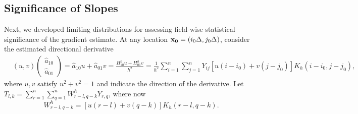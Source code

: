 \documentclass{article}
\def\ha{\hat{a}}
\begin{document}
\subsection{Significance of Slopes}
\label{sec-extreSSS_1st}
Next, we developed limiting distributions for assessing field-wise statistical significance of the gradient estimate.
At any location ${\bf x_0}=(i_0\Delta,j_0\Delta)$, consider the estimated directional derivative
\begin{equation}
	\label{direct_1st}
	\begin{aligned}
		&(u,v)\left(
		\begin{matrix}
			\ha_{10}\\
			\ha_{01}
		\end{matrix}
		\right)=\ha_{10}u+\ha_{01}v=\frac{H^h_{10}u+H^h_{01}v}{h^2}
		=\frac{1}{h^2}\sum_{i=1}^n\sum_{j=1}^nY_{ij}[u(i-i_0)+v(j-j_0)]K_h(i-i_0,j-j_0),
	\end{aligned}
\end{equation}
where $u, v$ satisfy $u^2+v^2=1$ and indicate the direction of the derivative. 
Let $T_{l,k}=\sum_{r=1}^{n}\sum_{q=1}^{n}W^h_{r-l,q-k}Y_{r,q}$,
where now
\begin{equation}
	\label{W_1st}
	W^h_{r-l,q-k}=[u(r-l)+v(q-k)]K_{h}(r-l,q-k).
\end{equation}
\end{document}
